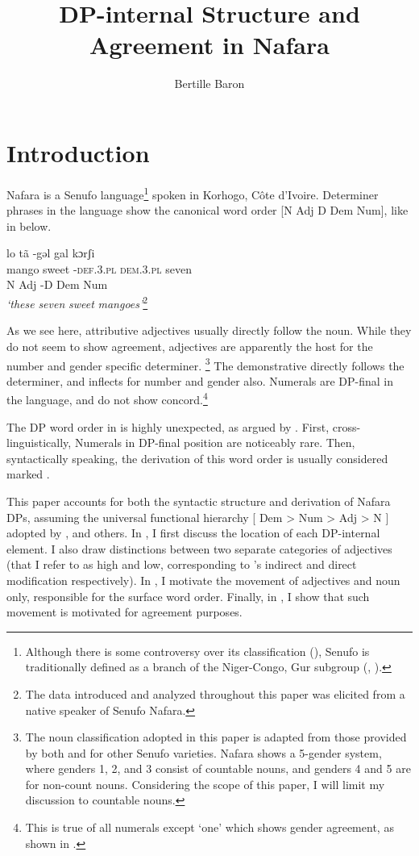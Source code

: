 \documentclass[output=paper]{langscibook}
\author{Bertille Baron\affiliation{Georgetown University}}
\title{DP-internal Structure and Agreement in Nafara}
\begin{document}
  

\section{Introduction}

Nafara is a Senufo language\footnote{Although there is some controversy over its classification (\citealt{Manessy1975,Naden1989}), Senufo is traditionally defined as a branch of the Niger-Congo, Gur subgroup (\citealt{Westermann1970}, \citealt{BendorSamuel1971}).} spoken in Korhogo, Côte d’Ivoire. Determiner phrases in the language show the canonical word order [N Adj D Dem Num], like in  below. 


\ea
\glll lo  tã -gəl  gal kɔrʃi \label{ex:baron:1}\\
      mango sweet -\textsc{def.3.pl} \textsc{dem.3.pl} seven\\
      N Adj -D Dem Num\\
\glt \textit{‘these} \textit{seven} \textit{sweet} \textit{mangoes’}\footnote{The data introduced and analyzed throughout this paper was elicited from a native speaker of Senufo Nafara.}
\z

As we see here, attributive adjectives usually directly follow the noun. While they do not seem to show agreement, adjectives are apparently the host for the number and gender specific determiner.{} \footnote{The noun classification adopted in this paper is adapted from those provided by both \citet[22]{Manessy1996} and \citet[76]{Carlson1990} for other Senufo varieties. Nafara shows a 5-gender system, where genders 1, 2, and 3 consist of countable nouns, and genders 4 and 5 are for non-count nouns. Considering the scope of this paper, I will limit my discussion to countable nouns.} The demonstrative directly follows the determiner, and inflects for number and gender also. Numerals are DP-final in the language, and do not show concord.\footnote{This is true of all numerals except ‘one’ which shows gender agreement, as shown in .}

The DP word order in  is highly unexpected, as argued by \citet{Cinque2005}. First, cross-linguistically, Numerals in DP-final position are noticeably rare. Then, syntactically speaking, the derivation of this word order is usually considered marked \citep{Cinque2005}.

This paper accounts for both the syntactic structure and derivation of Nafara DPs, assuming the universal functional hierarchy [ Dem > Num > Adj > N ] adopted by \citet{Greenberg1963}, \citet{Cinque2005} and others. In , I first discuss the location of each DP-internal element. I also draw distinctions between two separate categories of adjectives (that I refer to as high and low, corresponding to \citealt{Cinque2010}’s  indirect and direct modification respectively). In , I motivate the movement of adjectives and noun only, responsible for the surface word order. Finally, in , I show that such movement is motivated for agreement purposes.
\end{document}
